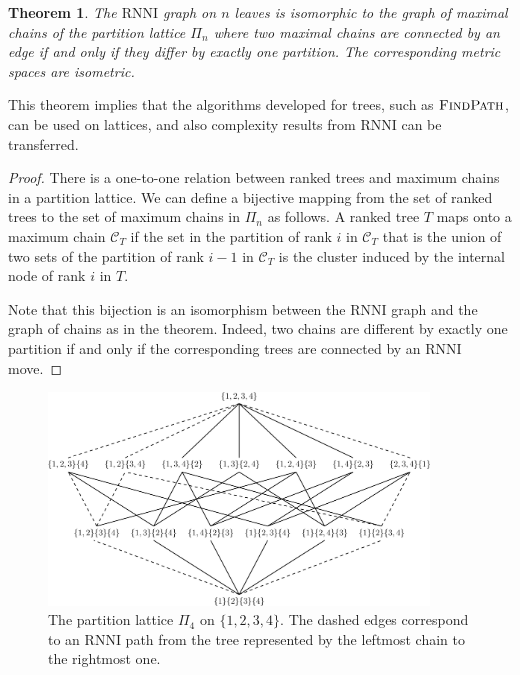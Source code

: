 \documentclass[11pt]{amsart}
\newtheorem{theorem}{Theorem}
\newcommand{\rnni}{\mathrm{RNNI}}
\newcommand{\findpath}{\textsc{FindPath}}
\begin{document}
\begin{theorem}
The $\rnni$ graph on $n$ leaves is isomorphic to the graph of maximal chains of the partition lattice $\Pi_n$ where two maximal chains are connected by an edge if and only if they differ by exactly one partition.
The corresponding metric spaces are isometric.
\label{thm:partition_lattice}
\end{theorem}

This theorem implies that the algorithms developed for trees, such as $\findpath$, can be used on lattices, and also complexity results from $\rnni$ can be transferred.

\begin{proof}
There is a one-to-one relation between ranked trees and maximum chains in a partition lattice.
We can define a bijective mapping from the set of ranked trees to the set of maximum chains in $\Pi_n$ as follows.
A ranked tree $T$ maps onto a maximum chain $\mathcal{C}_T$ if the set in the partition of rank $i$ in $\mathcal{C}_T$ that is the union of two sets of the partition of rank $i-1$ in $\mathcal{C}_T$ is the cluster induced by the internal node of rank $i$ in $T$.

Note that this bijection is an isomorphism between the $\rnni$ graph and the graph of chains as in the theorem.
Indeed, two chains are different by exactly one partition if and only if the corresponding trees are connected by an $\rnni$ move.
\end{proof}

\begin{figure}[ht]
\centering
\includegraphics[width=0.9\textwidth]{partition_lattice4}
\vspace{12pt}
\caption{The partition lattice $\Pi_4$ on $\{1,2,3,4\}$.
The dashed edges correspond to an $\rnni$ path from the tree represented by the leftmost chain to the rightmost one.}
\label{fig:partition_lattice4}
\end{figure}
\end{document}
